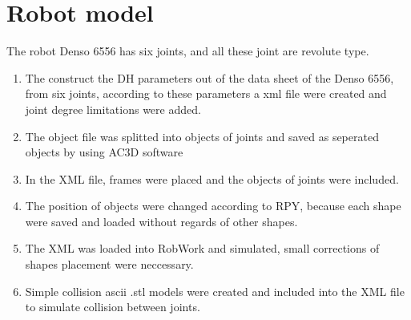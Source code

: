 \section{Robot model}
\label{sec:program}

The robot Denso 6556 has six joints, and all these joint are revolute type. 

\begin{enumerate}
	\item The  construct the DH parameters out of the data sheet of the Denso 6556, from six joints, according to these parameters a xml file were created and joint degree limitations were added. \\
	\item  The object file was splitted into objects of joints and saved as seperated objects by using AC3D software \\
	\item  In the XML file, frames were placed and the objects of joints were included. \\
	\item The position of objects were changed according to RPY, because each shape were saved and loaded without regards of other shapes. \\
	\item The XML was loaded into RobWork and simulated, small corrections of shapes placement were neccessary. \\
	\item Simple collision ascii .stl models were created and included into the XML file to simulate collision between joints. \\

\end{enumerate}

